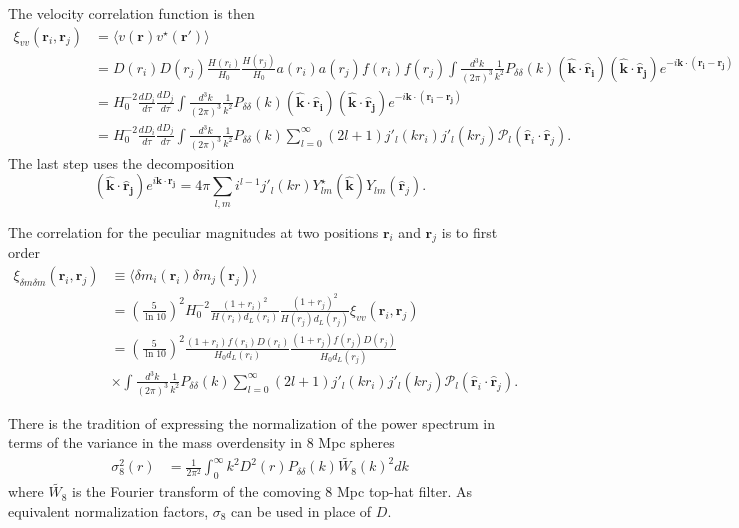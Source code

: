 \documentclass[11pt, oneside]{article}   	%
\begin{document}
The  velocity correlation function is then
\begin{align}
\xi_{v v}(\mathbf{r}_i,\mathbf{r}_j)  & =
\langle v(\mathbf{r})  v^{\star}(\mathbf{r'}) \rangle \\
& = D(r_i) D(r_j)  \frac{H(r_i)}{H_0} \frac{H(r_j)}{H_0} a(r_i) a(r_j) f(r_i) f(r_j)
\int \frac{d^3k}{(2\pi)^3}  \frac{1}{k^2} P_{\delta \delta}(k) 
(\mathbf{\hat{k}} \cdot \mathbf{\hat{r}_i})(\mathbf{\hat{k}} \cdot \mathbf{\hat{r}_j})
e^{-i \mathbf{k}\cdot (\mathbf{r_i}-\mathbf{r_j})} \\
&= H_0^{-2}\frac{dD_i}{d\tau} \frac{dD_j}{d\tau}   \int \frac{d^3k}{(2\pi)^3}  \frac{1}{k^2}  P_{\delta \delta}(k) (\mathbf{\hat{k}} \cdot \mathbf{\hat{r}_i})(\mathbf{\hat{k}} \cdot \mathbf{\hat{r}_j})  e^{-i \mathbf{k}\cdot (\mathbf{r_i}-\mathbf{r_j})}\\
&= H_0^{-2} \frac{dD_i}{d\tau} \frac{dD_j}{d\tau}   \int \frac{d^3k}{(2\pi)^3}  \frac{1}{k^2}  P_{\delta \delta}(k) \sum_{l=0}^{\infty}(2l+1) j'_l(kr_i) j'_l(kr_j)
\mathcal{P}_l(\mathbf{\hat{r}}_i \cdot \mathbf{\hat{r}}_j).
\end{align}
The last step uses the decomposition
\begin{equation}
(\mathbf{\hat{k}} \cdot \mathbf{\hat{r}_j})   e^{i \mathbf{k}\cdot \mathbf{r_j}} = 4\pi \sum_{l,m} i^{l-1}j'_l(kr) Y^{\star}_{lm}(\mathbf{\hat{k}})
Y_{lm}(\mathbf{\hat{r}}_j).
\end{equation}

The correlation for the peculiar magnitudes at two positions
$\mathbf{r}_i$ and $\mathbf{r}_j$ is to first order 
\begin{align}
\xi_{\delta m \delta m}(\mathbf{r}_i,\mathbf{r}_j)  & \equiv  \langle \delta m_i(\mathbf{r}_i) \delta m_j(\mathbf{r}_j) \rangle\\
& =  \left( \frac{5}{\ln{10}}\right)^2  H_0^{-2}\frac{(1+r_i)^2}{H(r_i)d_L(r_i)} \frac{(1+r_j)^2}{H(r_j)d_L(r_j)} \xi_{v v}(\mathbf{r}_i,\mathbf{r}_j)  \\
& =  \left( \frac{5}{\ln{10}}\right)^2 \frac{(1+r_i)f(r_i)D(r_i)}{H_0d_L(r_i)} \frac{(1+r_j)f(r_j)D(r_j)}{H_0d_L(r_j)}  \\
& \times  \int \frac{d^3k}{(2\pi)^3}  \frac{1}{k^2}  P_{\delta \delta}(k) \sum_{l=0}^{\infty}(2l+1) j'_l(kr_i) j'_l(kr_j)
\mathcal{P}_l(\mathbf{\hat{r}}_i \cdot \mathbf{\hat{r}}_j).
\end{align}

There is the tradition of expressing the normalization of the power spectrum in terms of
the variance in the mass overdensity in 8 Mpc spheres 
\begin{align}
\sigma^2_8 (r)& = \frac{1}{2\pi^2} \int_0^\infty  k^2 D^2(r)  P_{\delta \delta}(k) \tilde{W_8}(k)^2 dk
\label{sigma_8:eqn}
\end{align}
where $\tilde{W_8}$ is the Fourier transform of the comoving 8 Mpc top-hat filter.
As equivalent normalization factors, $\sigma_8$ can be used in place of $D$.
\end{document}
